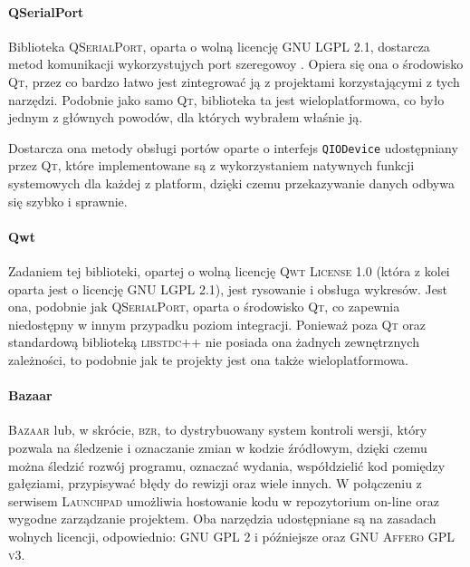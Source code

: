 \paragraph{QSerialPort}
Biblioteka \textsc{QSerialPort}, oparta o wolną licencję \textsc{GNU LGPL 2.1}, dostarcza metod komunikacji wykorzystujych port szeregowoy . Opiera się ona o środowisko \textsc{Qt}, przez co bardzo łatwo jest zintegrować ją z projektami korzystającymi z tych narzędzi. Podobnie jako samo \textsc{Qt}, biblioteka ta jest wieloplatformowa, co było jednym z głównych powodów, dla których wybrałem właśnie ją.

Dostarcza ona metody obsługi portów oparte o interfejs \verb|QIODevice| udostępniany przez \textsc{Qt}, które implementowane są z wykorzystaniem natywnych funkcji systemowych dla każdej z platform, dzięki czemu przekazywanie danych odbywa się szybko i sprawnie.

\paragraph{Qwt}
Zadaniem tej biblioteki, opartej o wolną licencję \textsc{Qwt License 1.0} (która z kolei oparta jest o licencję \textsc{GNU LGPL 2.1}), jest rysowanie i obsługa wykresów. Jest ona, podobnie jak \textsc{QSerialPort}, oparta o środowisko \textsc{Qt}, co zapewnia niedostępny w innym przypadku poziom integracji. Ponieważ poza \textsc{Qt} oraz standardową biblioteką \textsc{libstdc++} nie posiada ona żadnych zewnętrznych zależności, to podobnie jak te projekty jest ona także wieloplatformowa.

\paragraph{Bazaar}
\textsc{Bazaar} lub, w skrócie, \textsc{bzr}, to dystrybuowany system kontroli wersji, który pozwala na śledzenie i oznaczanie zmian w kodzie źródłowym, dzięki czemu można śledzić rozwój programu, oznaczać wydania, współdzielić kod pomiędzy gałęziami,  przypisywać błędy do rewizji oraz wiele innych. W połączeniu z serwisem \textsc{Launchpad} umożliwia hostowanie kodu w repozytorium on-line oraz wygodne zarządzanie projektem. Oba narzędzia udostępniane są na zasadach wolnych licencji, odpowiednio: \textsc{GNU GPL 2} i późniejsze oraz \textsc{GNU Affero GPL v3}.

